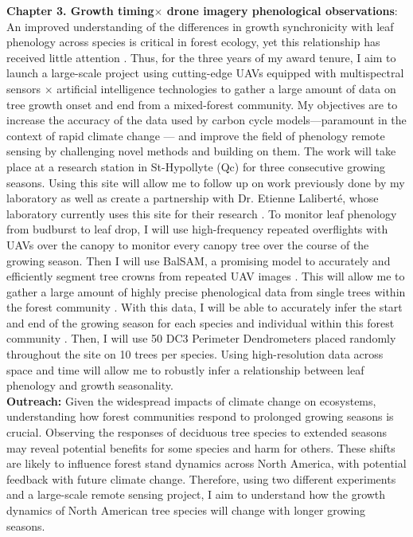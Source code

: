 \documentclass[12pt]{article}
\begin{document}
\textbf{Chapter 3. Growth timing$\times$ drone imagery phenological observations}:
An improved understanding of the differences in growth synchronicity with leaf phenology across species is critical in forest ecology, yet this relationship has received little attention \cite{klein_coordination_2016,kramer_importance_2000}. Thus, for the three years of my award tenure, I aim to launch a large-scale project using cutting-edge UAVs equipped with multispectral sensors $\times$ artificial intelligence technologies \cite{ball_accurate_2023,teng_bringing_2025,ulku_deep_2022} to gather a large amount of data on tree growth onset and end from a mixed-forest community. My objectives are to increase the accuracy of the data used by carbon cycle models---paramount in the context of rapid climate change \cite{richardson_climate_2013,swidrak_comparing_2013}--- and improve the field of phenology remote sensing by challenging novel methods and building on them. The work will take place at a research station in St-Hypollyte (Qc) for three consecutive growing seasons. Using this site will allow me to follow up on work previously done by my laboratory \cite{flynn_temperature_2018} as well as create a partnership with Dr. Etienne Laliberté, whose laboratory currently uses this site for their research \cite{cloutier_influence_2024}. To monitor leaf phenology from budburst to leaf drop, I will use high-frequency repeated overflights with UAVs over the canopy to monitor every canopy tree over the course of the growing season. Then I will use BalSAM, a promising model to accurately and efficiently segment tree crowns from repeated UAV images \cite{teng_bringing_2025}. This will allow me to gather a large amount of highly precise phenological data from single trees within the forest community \cite{teng_bringing_2025}. With this data, I will be able to accurately infer the start and end of the growing season for each species and individual within this forest community \cite{berra_assessing_2019,fawcett_monitoring_2021}. Then, I will use 50 DC3 Perimeter Dendrometers placed randomly throughout the site on 10 trees per species. Using high-resolution data across space and time will allow me to robustly infer a relationship between leaf phenology and growth seasonality.\\
\textbf{Outreach:}
Given the widespread impacts of climate change on ecosystems, understanding how forest communities respond to prolonged growing seasons is crucial. Observing the responses of deciduous tree species to extended seasons may reveal potential benefits for some species and harm for others. These shifts are likely to influence forest stand dynamics across North America, with potential feedback with future climate change. Therefore, using two different experiments and a large-scale remote sensing project, I aim to understand how the growth dynamics of North American tree species will change with longer growing seasons.  

\newpage


\end{document}
